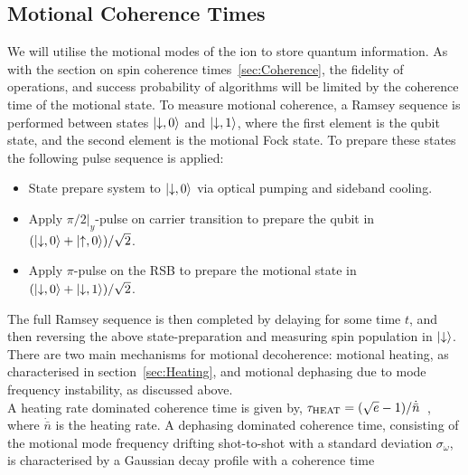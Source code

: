 \subsection{Motional Coherence Times}
\label{sec:Motional Coherence}
    We will utilise the motional modes of the ion to store quantum information.
    As with the section on spin coherence times~\ref{sec:Coherence}, the
    fidelity of operations, and success probability of algorithms will be
    limited by the coherence time of the motional state.  To measure motional
    coherence, a Ramsey sequence is performed between states $\ket{\downarrow, 0}$
     and $\ket{\downarrow, 1}$, where the first element is the qubit
    state, and the second element is the motional Fock state. To prepare these
    states the following pulse sequence is applied:
    \begin{itemize}
    \item State prepare system to $\ket{\downarrow, 0}$ via optical pumping and sideband cooling.
    \item Apply $\pi/2|_y$-pulse on carrier transition to prepare the qubit in $(\ket{\downarrow, 0} + \ket{\uparrow, 0})/\sqrt{2}$.
    \item Apply $\pi$-pulse on the RSB to prepare the motional state in $(\ket{\downarrow, 0} + \ket{\downarrow, 1})/\sqrt{2}$.
    \end{itemize}
    The full Ramsey sequence is then completed by delaying for some time $t$,
    and then reversing the above state-preparation and measuring spin population in
    $\ket{\downarrow}$. \\
    There are two main mechanisms for motional decoherence: motional heating, as
    characterised in section~\ref{sec:Heating}, and motional dephasing due to
    mode frequency instability, as discussed above. \\
    A heating rate dominated coherence time is given by, $\tau_{\rm HEAT} =
    (\sqrt{e}-1)/\dot{\bar{n}}$~\cite{}, where $\dot{\bar{n}}$ is the heating
    rate. A dephasing dominated coherence time, consisting of the
    motional mode frequency drifting shot-to-shot with a standard deviation
    $\sigma_{\omega}$, is characterised by a Gaussian decay profile with a coherence time
